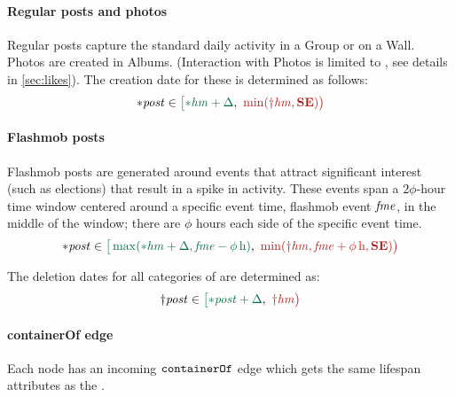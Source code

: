 \paragraph{Regular posts and photos}

Regular posts capture the standard daily activity in a Group or on a Wall.
Photos are created in Albums. (Interaction with Photos is limited to \tLikes, see details in \autoref{sec:likes}). The creation date for these is determined as follows:
$$\varc{\ePost} \in \interval{\varc{\eHasMember} + \Delta}{\min (\vard{\eHasMember}, \xSE) }$$

\paragraph{Flashmob posts}

Flashmob posts are generated around events that attract significant interest
(such as elections) that result in a spike in activity.
These events span a $2\phi$-hour time window centered around a specific event time, %
flashmob event $\mathit{fme}$, in the middle of the window; there are $\phi$ hours each side of the specific event time.
$$
\varc{\ePost} \in \interval{\max(\varc{\eHasMember} + \Delta,\eFlashmobEvent - \phi\textrm{\,h})}{\min (\vard{\eHasMember},\eFlashmobEvent + \phi\textrm{\,h},\xSE)}
$$

The deletion dates for all categories of \tPosts are determined as:
$$\vard{\ePost} \in \interval{\varc{\ePost} + \Delta}{\vard{\eHasMember}}$$


\paragraph{containerOf edge}

Each \tPost node has an incoming $\texttt{containerOf}$ edge which gets the same lifespan attributes as the \tPost.

